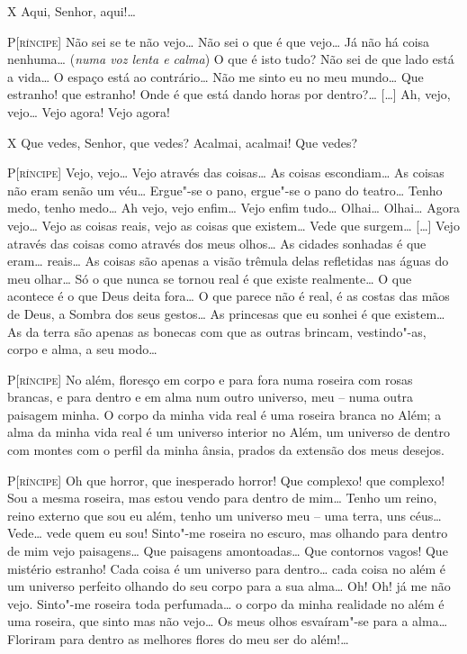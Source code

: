 \textsc{X} Aqui, Senhor, aqui!\ldots{}

\textsc{P[ríncipe]} Não sei se te não vejo\ldots{} Não sei o que é que vejo\ldots{} Já
não há coisa nenhuma\ldots{} (\textit{numa voz lenta e calma}) O que é
isto tudo? Não sei de que lado está a vida\ldots{} O espaço está ao
contrário\ldots{} Não me sinto eu no meu mundo\ldots{} Que estranho! que
estranho! Onde é que está dando horas por dentro?\ldots{} [\ldots{}] Ah, vejo,
vejo\ldots{} Vejo agora! Vejo agora! 

\textsc{X} Que vedes, Senhor, que vedes? Acalmai, acalmai! Que vedes?

\textsc{P[ríncipe]} Vejo, vejo\ldots{} Vejo através das coisas\ldots{} As coisas
escondiam\ldots{} As coisas não eram senão um véu\ldots{} Ergue"-se o pano,
ergue"-se o pano do teatro\ldots{} Tenho medo, tenho medo\ldots{} Ah vejo, vejo
enfim\ldots{} Vejo enfim tudo\ldots{} Olhai\ldots{} Olhai\ldots{} Agora vejo\ldots{} Vejo as
coisas reais, vejo as coisas que existem\ldots{} Vede que surgem\ldots{} [\ldots{}]
Vejo através das coisas como através dos meus olhos\ldots{} As cidades
sonhadas é que eram\ldots{} reais\ldots{} As coisas são apenas a visão trêmula
delas refletidas nas águas do meu olhar\ldots{} Só o que nunca se tornou
real é que existe realmente\ldots{} O que acontece é o que Deus deita
fora\ldots{} O que parece não é real, é as costas das mãos de Deus, a
Sombra dos seus gestos\ldots{} As princesas que eu sonhei é que existem\ldots{}
As da terra são apenas as bonecas com que as outras brincam,
vestindo"-as, corpo e alma, a seu modo\ldots{}

\textsc{P[ríncipe]} No além, floresço em corpo e para fora numa roseira com
rosas brancas, e para dentro e em alma num outro universo, meu -- numa
outra paisagem minha. O corpo da minha vida real é uma roseira branca
no Além; a alma da minha vida real é um universo interior no Além, um
universo de dentro com montes com o perfil da minha ânsia, prados da
extensão dos meus desejos.

\textsc{P[ríncipe]} Oh que horror, que inesperado horror! Que complexo! que
complexo! Sou a mesma roseira, mas estou vendo para dentro de mim\ldots{}
Tenho um reino, reino externo que sou eu além, tenho um universo meu
-- uma terra, uns céus\ldots{} Vede\ldots{} vede quem eu sou! Sinto"-me roseira
no escuro, mas olhando para dentro de mim vejo paisagens\ldots{} Que
paisagens amontoadas\ldots{} Que contornos vagos! Que mistério estranho!
Cada coisa é um universo para dentro\ldots{} cada coisa no além é um
universo perfeito olhando do seu corpo para a sua alma\ldots{} Oh! Oh! já
me não vejo. Sinto"-me roseira toda perfumada\ldots{} o corpo da minha
realidade no além é uma roseira, que sinto mas não vejo\ldots{} Os meus
olhos esvaíram"-se para a alma\ldots{} Floriram para dentro as melhores
flores do meu ser do além!\ldots{}

